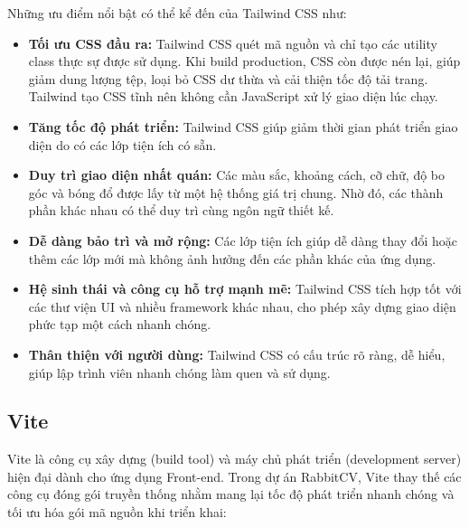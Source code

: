 \medskip
Những ưu điểm nổi bật có thể kể đến của Tailwind CSS như:
\medskip

\begin{itemize}
    \item \textbf{Tối ưu CSS đầu ra:} Tailwind CSS quét mã nguồn và chỉ tạo các utility class thực sự được sử dụng. Khi build production, CSS còn được nén lại, giúp giảm dung lượng tệp, loại bỏ CSS dư thừa và cải thiện tốc độ tải trang. Tailwind tạo CSS tĩnh nên không cần JavaScript xử lý giao diện lúc chạy.
    \item \textbf{Tăng tốc độ phát triển:} Tailwind CSS giúp giảm thời gian phát triển giao diện do có các lớp tiện ích có sẵn.
    \item \textbf{Duy trì giao diện nhất quán:} Các màu sắc, khoảng cách, cỡ chữ, độ bo góc và bóng đổ được lấy từ một hệ thống giá trị chung. Nhờ đó, các thành phần khác nhau có thể duy trì cùng ngôn ngữ thiết kế.
    \item \textbf{Dễ dàng bảo trì và mở rộng:} Các lớp tiện ích giúp dễ dàng thay đổi hoặc thêm các lớp mới mà không ảnh hưởng đến các phần khác của ứng dụng.
    \item \textbf{Hệ sinh thái và công cụ hỗ trợ mạnh mẽ:} Tailwind CSS tích hợp tốt với các thư viện UI và nhiều framework khác nhau, cho phép xây dựng giao diện phức tạp một cách nhanh chóng.
    \item \textbf{Thân thiện với người dùng:} Tailwind CSS có cấu trúc rõ ràng, dễ hiểu, giúp lập trình viên nhanh chóng làm quen và sử dụng.
\end{itemize}

\subsection{Vite}

Vite là công cụ xây dựng (build tool) và máy chủ phát triển (development server) hiện đại dành cho ứng dụng Front-end. Trong dự án RabbitCV, Vite thay thế các công cụ đóng gói truyền thống nhằm mang lại tốc độ phát triển nhanh chóng và tối ưu hóa gói mã nguồn khi triển khai:

